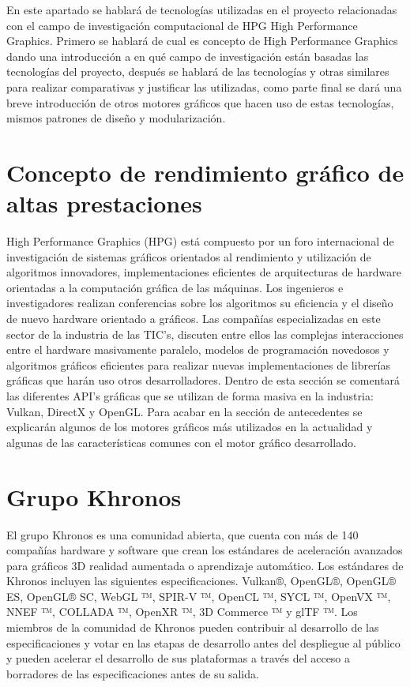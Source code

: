 \documentclass[a4paper, 17pt]{book}
\begin{document}
En este apartado se hablará de tecnologías utilizadas en el proyecto relacionadas con el campo de investigación
computacional de HPG High Performance Graphics. 
\bigbreak
Primero se hablará de cual es concepto de High Performance Graphics dando una introducción a en qué
campo de investigación están basadas las tecnologías del proyecto, después se hablará de las tecnologías
y otras similares para realizar comparativas y justificar las utilizadas, como parte final se dará una
breve introducción de otros motores gráficos que hacen uso de estas tecnologías, mismos patrones de diseño y modularización.

\section{Concepto de rendimiento gráfico de altas prestaciones} 
\label{sec:HPG}

High Performance Graphics (HPG) está compuesto por un foro internacional de investigación de sistemas gráficos
orientados al rendimiento y utilización de algoritmos innovadores, implementaciones eficientes de arquitecturas
de hardware orientadas a la computación gráfica de las máquinas. 
\bigbreak
Los ingenieros e investigadores realizan conferencias sobre los algoritmos su eficiencia y el diseño de nuevo
hardware orientado a gráficos. Las compañías especializadas en este sector de la industria de las TIC’s, discuten
entre ellos las complejas interacciones entre el hardware masivamente paralelo, modelos de programación novedosos
y algoritmos gráficos eficientes para realizar nuevas implementaciones de librerías gráficas que harán uso otros
desarrolladores.
\bigbreak
Dentro de esta sección se comentará las diferentes API’s gráficas que se utilizan de forma masiva en la industria:
Vulkan, DirectX y OpenGL. Para acabar en la sección de antecedentes se explicarán algunos de los motores gráficos
más utilizados en la actualidad y algunas de las características comunes con el motor gráfico desarrollado.

\section{Grupo Khronos} 
\label{sec:Grupo Khronos}

El grupo Khronos es una comunidad abierta, que cuenta con más de 140 compañías hardware y software que crean los estándares de
aceleración avanzados para gráficos 3D realidad aumentada o aprendizaje automático. Los estándares de Khronos incluyen las
siguientes especificaciones.  Vulkan®, OpenGL®, OpenGL® ES, OpenGL® SC, WebGL ™, SPIR-V ™, OpenCL ™, SYCL ™, OpenVX ™,
NNEF ™, COLLADA ™, OpenXR ™, 3D Commerce ™ y glTF ™. 
\bigbreak
Los miembros de la comunidad de Khronos pueden contribuir al desarrollo de las especificaciones y votar en las etapas de
desarrollo antes del despliegue al público y pueden acelerar el desarrollo de sus plataformas a través del acceso a
borradores de las especificaciones antes de su salida.
\end{document}
